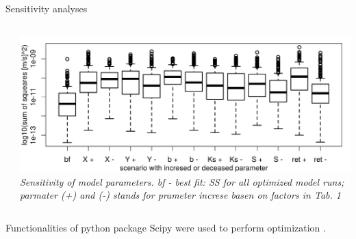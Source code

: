 \begin{block}{Sensitivity analyses}
\begin{columns}
\begin{column}{0.25\textwidth}
\begin{table}[]
\begin{tabular}{lll}
            \end{tabular}
        \end{table}
    \end{column}
    \begin{column}{0.5\textwidth}
        \includegraphics[width = \textwidth]{obr/sens.png}
        {\it Sensitivity of model parameters. bf - best fit: SS for all optimized model runs; parmater (+) and (-) stands for prameter increse basen on factors in Tab. 1}
    \end{column}
\end{columns}
Functionalities of python package Scipy were used to perform optimization \citep{scipy}.
\end{block}

% 

